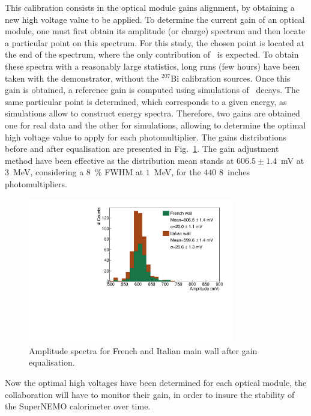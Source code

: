 This calibration consists in the optical module gains alignment, by obtaining a new high voltage value to be applied.
To determine the current gain of an optical module, one must first obtain its amplitude (or charge) spectrum and then locate a particular point on this spectrum.
For this study, the chosen point is located at the end of the spectrum, where the only contribution of \Tl\ is expected.
To obtain these spectra with a reasonably large statistics, long runs (few hours) have been taken with the demonstrator, without the $^{207}$Bi calibration sources.
Once this gain is obtained, a reference gain is computed using simulations of \Tl\ decays.
The same particular point is determined, which corresponds to a given energy, as simulations allow to construct energy spectra.
Therefore, two gains are obtained one for real data and the other for simulations, allowing to determine the optimal high voltage value to apply for each photomultiplier.
The gains distributions before and after equalisation are presented in Fig.~\ref{fig:Axel_gain}.
The gain adjustment method have been effective as the distribution mean stands at $606.5\pm1.4$~mV at $3$~MeV, considering a $8$~\% FWHM at $1$~MeV, for the $440$ $8$~inches photomultipliers.
\begin{figure}[h!]
  \centering
  \includegraphics[width=0.8\textwidth]{commissioning/fig_commissioning/equal_gains_Axel.pdf}
  \caption{Amplitude spectra for French and Italian main wall after gain equalisation.
    \label{fig:Axel_gain}}
\end{figure}

Now the optimal high voltages have been determined for each optical module, the collaboration will have to monitor their gain, in order to insure the stability of the SuperNEMO calorimeter over time.



